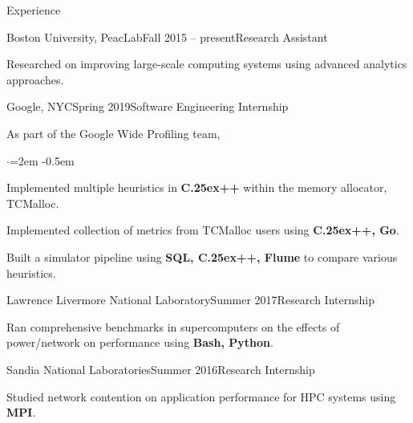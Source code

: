 \documentclass{resume}
\def\bfCplusplus{{\rm{\bf C\raise.25ex\hbox{\small ++}}}}
\begin{document}
\begin{rSection}{Experience}

\begin{rWorksection}{Boston University, PeacLab}{Fall 2015 -- present}{Research Assistant}
\item Researched on improving large-scale computing systems using advanced
  analytics approaches.
\end{rWorksection}

\begin{rWorksection}{Google, NYC}{Spring 2019}{Software Engineering
    Internship}
\item As part of the Google Wide Profiling team,
  \begin{list}{$\cdot$}{\leftmargin=2em} %
    \itemsep -0.5em \vspace{-0.5em} %
  \item Implemented multiple heuristics in {\bf \bfCplusplus{}} within the memory
    allocator, TCMalloc.
  \item Implemented collection of metrics from TCMalloc users using {\bf
      \bfCplusplus{}, Go}.
  \item Built a simulator pipeline using {\bf SQL, \bfCplusplus{}, Flume} to
    compare various heuristics.
  \end{list}
\end{rWorksection}

\begin{rWorksection}{Lawrence Livermore National Laboratory}{Summer
    2017}{Research Internship}
\item Ran comprehensive benchmarks in supercomputers on the effects of
  power/network on performance using {\bf Bash, Python}.
\end{rWorksection}

\begin{rWorksection}{Sandia National Laboratories}{Summer 2016}{Research
    Internship}
\item Studied network contention on application performance for HPC systems
  using {\bf MPI}.
\end{rWorksection}

\end{rSection}
\end{document}
